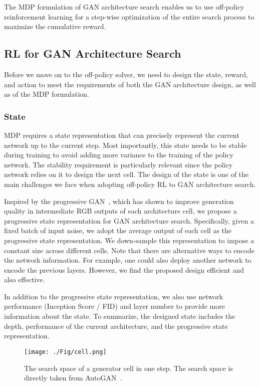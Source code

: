 \documentclass[runningheads]{llncs}
\begin{document}
The MDP formulation of GAN architecture search enables us to use off-policy reinforcement learning for a step-wise optimization of the entire search process to maximize the cumulative reward. 


\subsection{RL for GAN Architecture Search}
Before we move on to the off-policy solver, we need to design the state, reward, and action to meet the requirements of both the GAN architecture design, as well as of the MDP formulation.
\subsubsection{State}
MDP requires a state representation that can precisely represent the current network up to the current step. Most importantly,  this state needs to be stable during training to avoid adding more variance to the training of the policy network. The stability requirement is particularly relevant since the policy network relies on it to design the next cell. The design of the state is one of the main challenges we face when adopting off-policy RL to GAN architecture search.

Inspired by the progressive GAN~\cite{karras2017progressive}, which has shown to improve generation quality in intermediate RGB outputs of each architecture cell, we propose a progressive state representation for GAN architecture search. Specifically, given a fixed batch of input noise, we adopt the average output of each cell as the progressive state representation. We down-sample this representation to impose a constant size across different cells. Note that there are alternative ways to encode the network information. For example, one could also deploy another network to encode the previous layers. However, we find the proposed design efficient and also effective. 

In addition to the progressive state representation, we also use network performance (Inception Score / FID) and layer number to provide more information about the state. To summarize, the designed state  includes the depth, performance of the current architecture, and the progressive state representation.
\begin{figure}[htbp]
    \centering
    \texttt{[image: ./Fig/cell.png]}
    \caption{The search space of a generator cell in one step.  The search space is directly taken from AutoGAN~\cite{gong2019autogan}.}
\label{fig:cell}
\end{figure}
\end{document}
